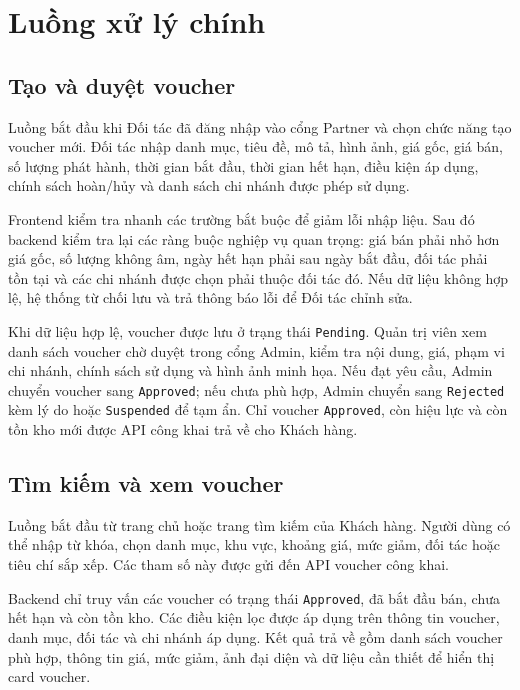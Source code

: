 \section{Luồng xử lý chính}

\subsection{Tạo và duyệt voucher}

Luồng bắt đầu khi Đối tác đã đăng nhập vào cổng Partner và chọn chức năng tạo voucher mới. Đối tác nhập danh mục, tiêu đề, mô tả, hình ảnh, giá gốc, giá bán, số lượng phát hành, thời gian bắt đầu, thời gian hết hạn, điều kiện áp dụng, chính sách hoàn/hủy và danh sách chi nhánh được phép sử dụng.

Frontend kiểm tra nhanh các trường bắt buộc để giảm lỗi nhập liệu. Sau đó backend kiểm tra lại các ràng buộc nghiệp vụ quan trọng: giá bán phải nhỏ hơn giá gốc, số lượng không âm, ngày hết hạn phải sau ngày bắt đầu, đối tác phải tồn tại và các chi nhánh được chọn phải thuộc đối tác đó. Nếu dữ liệu không hợp lệ, hệ thống từ chối lưu và trả thông báo lỗi để Đối tác chỉnh sửa.

Khi dữ liệu hợp lệ, voucher được lưu ở trạng thái \texttt{Pending}. Quản trị viên xem danh sách voucher chờ duyệt trong cổng Admin, kiểm tra nội dung, giá, phạm vi chi nhánh, chính sách sử dụng và hình ảnh minh họa. Nếu đạt yêu cầu, Admin chuyển voucher sang \texttt{Approved}; nếu chưa phù hợp, Admin chuyển sang \texttt{Rejected} kèm lý do hoặc \texttt{Suspended} để tạm ẩn. Chỉ voucher \texttt{Approved}, còn hiệu lực và còn tồn kho mới được API công khai trả về cho Khách hàng.

\subsection{Tìm kiếm và xem voucher}

Luồng bắt đầu từ trang chủ hoặc trang tìm kiếm của Khách hàng. Người dùng có thể nhập từ khóa, chọn danh mục, khu vực, khoảng giá, mức giảm, đối tác hoặc tiêu chí sắp xếp. Các tham số này được gửi đến API voucher công khai.

Backend chỉ truy vấn các voucher có trạng thái \texttt{Approved}, đã bắt đầu bán, chưa hết hạn và còn tồn kho. Các điều kiện lọc được áp dụng trên thông tin voucher, danh mục, đối tác và chi nhánh áp dụng. Kết quả trả về gồm danh sách voucher phù hợp, thông tin giá, mức giảm, ảnh đại diện và dữ liệu cần thiết để hiển thị card voucher.

